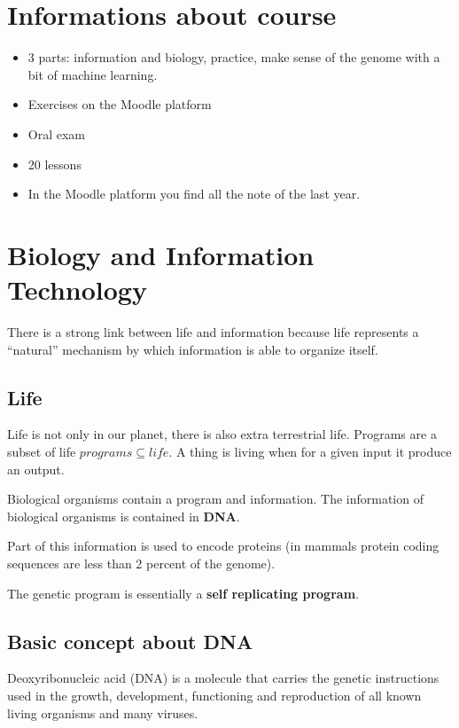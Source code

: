 \section{Informations about course}

\begin{itemize}
  \item 3 parts: information and biology, practice, make sense of the genome
with a bit of machine learning.
  \item Exercises on the Moodle platform
  \item Oral exam
  \item 20 lessons
  \item In the Moodle platform you find all the note of the last year.
\end{itemize}

\section{Biology and Information Technology}

There is a strong link between life and information because life represents a
``natural'' mechanism by which information is able to organize itself.

\subsection{Life}
Life is not only in our planet, there is also extra terrestrial life.
Programs are a subset of life $programs \subseteq life$. A thing is living
when for a given input it produce an output.

Biological organisms contain a program and information. The information of
biological organisms is contained in \textbf{DNA}.

Part of this information is used to encode proteins (in mammals protein coding
sequences are less than 2 percent of the genome).

The genetic program is essentially a \textbf{self replicating program}.

\subsection{Basic concept about DNA}

Deoxyribonucleic acid (DNA) is a molecule that carries the genetic instructions
used in the growth, development, functioning and reproduction of all known
living organisms and many viruses.

